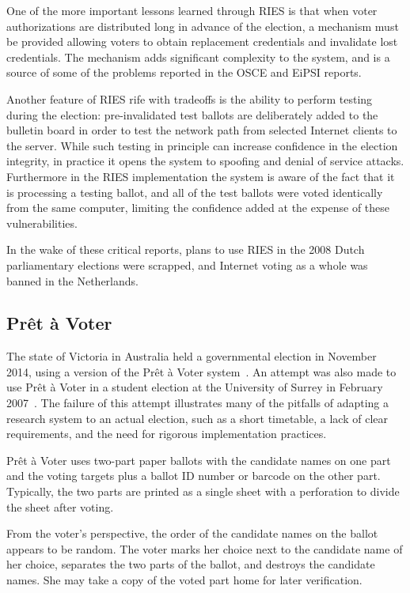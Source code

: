 One of the more important lessons learned through RIES is that when
voter authorizations are distributed long in advance of the election,
a mechanism must be provided allowing voters to obtain replacement
credentials and invalidate lost credentials. The mechanism adds
significant complexity to the system, and is a source of some of the
problems reported in the OSCE and EiPSI reports.

Another feature of RIES rife with tradeoffs is the ability to perform
testing during the election: pre-invalidated test ballots are
deliberately added to the bulletin board in order to test the network
path from selected Internet clients to the server. While such testing
in principle can increase confidence in the election integrity, in
practice it opens the system to spoofing and denial of service
attacks. Furthermore in the RIES implementation the system is aware of
the fact that it is processing a testing ballot, and all of the test
ballots were voted identically from the same computer, limiting the
confidence added at the expense of these vulnerabilities.

In the wake of these critical reports, plans to use RIES in the 2008
Dutch parliamentary elections were scrapped, and Internet voting as a
whole was banned in the Netherlands.

\subsection{Prêt à Voter}
\label{sec:pret-voter}

The state of Victoria in Australia held a governmental election in
November 2014, using a version of the Prêt à Voter
system~\cite{chaum2005, burton2012}. An attempt was also made to use
Prêt à Voter in a student election at the University of Surrey in
February 2007~\cite{bismark2007}. The failure of this attempt
illustrates many of the pitfalls of adapting a research system to an
actual election, such as a short timetable, a lack of clear
requirements, and the need for rigorous implementation practices.

Prêt à Voter uses two-part paper ballots with the candidate names on
one part and the voting targets plus a ballot ID number or barcode on
the other part. Typically, the two parts are printed as a single sheet
with a perforation to divide the sheet after voting.

From the voter's perspective, the order of the candidate names on the
ballot appears to be random. The voter marks her choice next to the
candidate name of her choice, separates the two parts of the ballot,
and destroys the candidate names. She may take a copy of the voted
part home for later verification.

